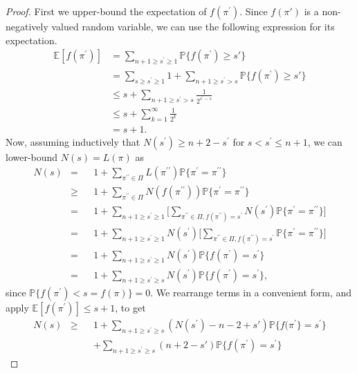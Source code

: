 \begin{appendices}
\begin{proof}
First we upper-bound the expectation of $f(\pi^\prime)$. Since $f(\pi')$ is a non-negatively valued random variable, we can use the following expression for its expectation. 
\begin{align*}
\mathbb{E}[f(\pi^\prime)] &= \sum_{n+1 \ge s^\prime \ge 1}\mathbb{P}\{f(\pi^\prime)\ge s'\} 
\\ &= \sum_{s\ge s^\prime \ge 1}1 + \sum_{n+1 \ge s^\prime > s}\mathbb{P}\{f(\pi^\prime)\ge s'\}\\
&\le s + \sum_{n+1 \ge s^\prime > s}\frac{1}{2^{s^\prime-s}}\\
&\le s + \sum_{k=1}^{\infty}\frac{1}{2^{k}}\\
&= s+1.
\end{align*}
Now, assuming inductively that $N(s^\prime)\ge n+2-s^\prime$ for $s< s^\prime\le n+1$, we can lower-bound $N(s)=L(\pi)$ as
\begin{align*}
N(s) &=&& 1+\sum_{\pi^{\prime\prime}\in\Pi}L(\pi^{\prime\prime})\mathbb{P}\{\pi^{\prime}=\pi^{\prime\prime}\}
\\ &\ge&& 1+\sum_{\pi^{\prime\prime}\in\Pi}N(f(\pi^{\prime\prime}))\mathbb{P}\{\pi^{\prime}=\pi^{\prime\prime}\}
\\ &=&& 1+\sum_{n+1 \ge s^\prime \ge 1} \Bigg[ \sum_{\pi^{\prime\prime}\in\Pi, f(\pi^{\prime\prime})=s^\prime}N(s^\prime)\mathbb{P}\{\pi^{\prime}=\pi^{\prime\prime}\}\Bigg] 
\\ &=&& 1+\sum_{n+1 \ge s^\prime \ge 1}N(s^\prime)\Bigg[\sum_{\pi^{\prime\prime}\in\Pi, f(\pi^{\prime\prime})=s^\prime}\mathbb{P}\{\pi^{\prime}=\pi^{\prime\prime}\}\Bigg]
\\ &=&& 1+\sum_{n+1 \ge s^\prime \ge 1}N(s^\prime)\mathbb{P}\{f(\pi^{\prime})=s^\prime\}
\\ &=&& 1+\sum_{n+1 \ge s^\prime \ge s}N(s^\prime)\mathbb{P}\{f(\pi^{\prime})=s^\prime\},
\end{align*}
since $\mathbb{P}\{f(\pi^{\prime})<s=f(\pi)\}=0$. We rearrange terms in a convenient form, and apply $\mathbb{E}[f(\pi^{\prime})] \leq s+ 1$, to get
\begin{align*}
N(s)&\ge&& 1+\sum_{n+1 \ge s^\prime \ge s}(N(s^\prime)-n-2+s')\mathbb{P}\{f(\pi^{\prime}\}=s^\prime\}
\\
&&&+\sum_{n+1 \ge s^\prime \ge s}(n+2-s')\mathbb{P}\{f(\pi^{\prime})=s^\prime\}

\end{align*}
\end{proof}
\end{appendices}
